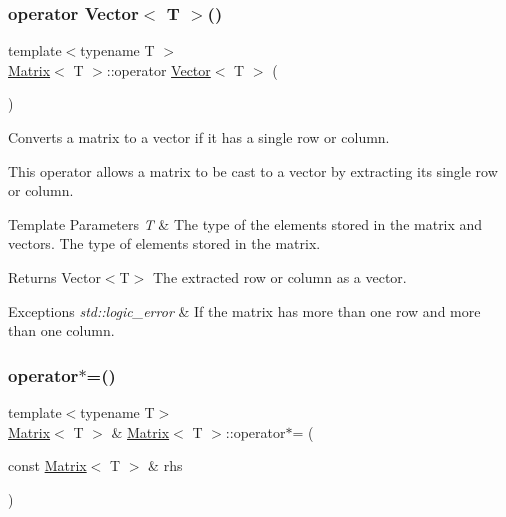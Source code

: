 \mbox{\label{classMatrix_a8d390e8b2581c65774f58a0a3b716dcb}} 
\subsubsection{\texorpdfstring{operator Vector$<$ T $>$()}{operator Vector< T >()}}
{\footnotesize\ttfamily template$<$typename T $>$ \\
\mbox{\hyperlink{classMatrix}{Matrix}}$<$ T $>$\+::operator \mbox{\hyperlink{classVector}{Vector}}$<$ T $>$ (\begin{DoxyParamCaption}{ }\end{DoxyParamCaption})\hspace{0.3cm}{\ttfamily [inline]}}



Converts a matrix to a vector if it has a single row or column. 

This operator allows a matrix to be cast to a vector by extracting its single row or column.


\begin{DoxyTemplParams}{Template Parameters}
{\em T} & The type of the elements stored in the matrix and vectors. The type of elements stored in the matrix. \\
\hline
\end{DoxyTemplParams}
\begin{DoxyReturn}{Returns}
Vector$<$\+T$>$ The extracted row or column as a vector.
\end{DoxyReturn}

\begin{DoxyExceptions}{Exceptions}
{\em std\+::logic\+\_\+error} & If the matrix has more than one row and more than one column. \\
\hline
\end{DoxyExceptions}
\mbox{\label{classMatrix_af6a95588910fa9c53feaae71fe88df81}} 
\subsubsection{\texorpdfstring{operator$\ast$=()}{operator*=()}\hspace{0.1cm}{\footnotesize\ttfamily [1/2]}}
{\footnotesize\ttfamily template$<$typename T$>$ \\
\mbox{\hyperlink{classMatrix}{Matrix}}$<$ T $>$ \& \mbox{\hyperlink{classMatrix}{Matrix}}$<$ T $>$\+::operator$\ast$= (\begin{DoxyParamCaption}\item[{const \mbox{\hyperlink{classMatrix}{Matrix}}$<$ T $>$ \&}]{rhs }\end{DoxyParamCaption})\hspace{0.3cm}{\ttfamily [inline]}}



